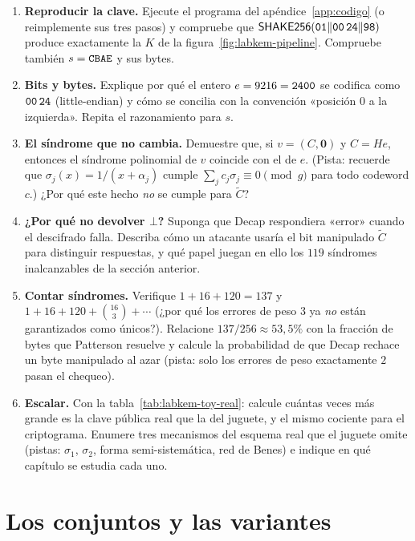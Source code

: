 \documentclass[11pt,a4paper,oneside]{report}
\newcommand{\hx}[1]{\text{\texttt{#1}}}
\begin{document}
\begin{enumerate}[leftmargin=1.6em,itemsep=4pt]
  \item \textbf{Reproducir la clave.} Ejecute el programa del
        apéndice~\ref{app:codigo} (o reimplemente sus tres pasos) y
        compruebe que $\textsf{SHAKE256}(\hx{01}\|\hx{00\,24}\|\hx{98})$
        produce exactamente la $K$ de la
        figura~\ref{fig:labkem-pipeline}. Compruebe también
        $s=\hx{CBAE}$ y sus bytes.
  \item \textbf{Bits y bytes.} Explique por qué el entero
        $e=9216=\hx{2400}$ se codifica como $\hx{00\,24}$ (little-endian)
        y cómo se concilia con la convención «posición $0$ a la
        izquierda». Repita el razonamiento para $s$.
  \item \textbf{El síndrome que no cambia.} Demuestre que, si
        $v=(C,\mathbf{0})$ y $C=He$, entonces el síndrome polinomial de
        $v$ coincide con el de $e$. (Pista: recuerde que
        $\sigma_j(x)=1/(x+\alpha_j)$ cumple
        $\sum_jc_j\sigma_j\equiv0\pmod g$ para todo codeword $c$.)
        ¿Por qué este hecho \emph{no} se cumple para $\tilde{C}$?
  \item \textbf{¿Por qué no devolver $\bot$?} Suponga que
        \textsf{Decap} respondiera «error» cuando el descifrado falla.
        Describa cómo un atacante usaría el bit manipulado $\tilde{C}$ para
        distinguir respuestas, y qué papel juegan en ello los $119$
        síndromes inalcanzables de la sección anterior.
  \item \textbf{Contar síndromes.} Verifique $1+16+120=137$ y
        $1+16+120+\binom{16}{3}+\cdots$ (¿por qué los errores de peso
        $3$ ya \emph{no} están garantizados como únicos?). Relacione
        $137/256\approx53{,}5\%$ con la fracción de bytes que Patterson
        resuelve y calcule la probabilidad de que \textsf{Decap}
        rechace un byte manipulado al azar (pista: solo los errores de
        peso exactamente $2$ pasan el chequeo).
  \item \textbf{Escalar.} Con la tabla~\ref{tab:labkem-toy-real}:
        calcule cuántas veces más grande es la clave pública real que la
        del juguete, y el mismo cociente para el criptograma. Enumere
        tres mecanismos del esquema real que el juguete omite (pistas:
        $\sigma_1$, $\sigma_2$, forma semi-sistemática, red de Benes)
        e indique en qué capítulo se estudia cada uno.
\end{enumerate}

\chapter{Los conjuntos y las variantes}\label{ch:parametros}
\end{document}
